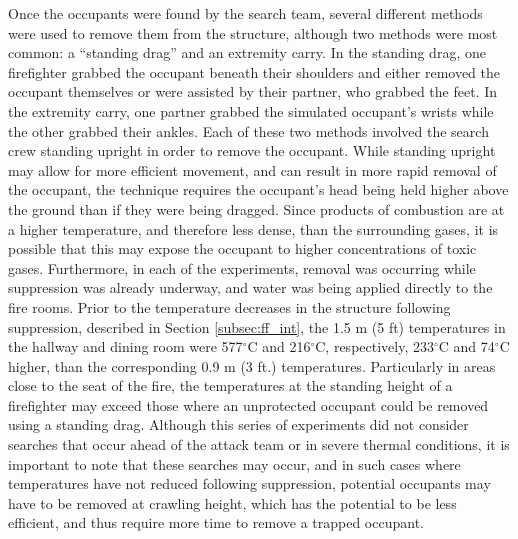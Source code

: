 \documentclass[12pt,oneside]{article}
\begin{document}
Once the occupants were found by the search team, several different methods were used to remove them from the structure, although two methods were most common: a ``standing drag'' \cite{IAFC} and an extremity carry. In the standing drag, one firefighter grabbed the occupant beneath their shoulders and either removed the occupant themselves or were assisted by their partner, who grabbed the feet. In the extremity carry, one partner grabbed the simulated occupant's wrists while the other grabbed their ankles. Each of these two methods involved the search crew standing upright in order to remove the occupant. While standing upright may allow for more efficient movement, and can result in more rapid removal of the occupant, the technique requires the occupant's head being held higher above the ground than if they were being dragged. Since products of combustion are at a higher temperature, and therefore less dense, than the surrounding gases, it is possible that this may expose the occupant to higher concentrations of toxic gases. Furthermore, in each of the experiments, removal was occurring while suppression was already underway, and water was being applied directly to the fire rooms. Prior to the temperature decreases in the structure following suppression, described in Section \ref{subsec:ff_int}, the 1.5 m (5 ft) temperatures in the hallway and dining room were 577$^{\circ}$C and 216$^{\circ}$C, respectively,  233$^{\circ}$C and 74$^{\circ}$C higher, than the corresponding 0.9 m (3 ft.) temperatures. Particularly in areas close to the seat of the fire, the temperatures at the standing height of a firefighter may exceed those where an unprotected occupant could be removed using a standing drag. Although this series of experiments did not consider searches that occur ahead of the attack team or in severe thermal conditions, it is important to note that these searches may occur, and in such cases where temperatures have not reduced following suppression, potential occupants may have to be removed at crawling height, which has the potential to be less efficient, and thus require more time to remove a trapped occupant.  
\end{document}
